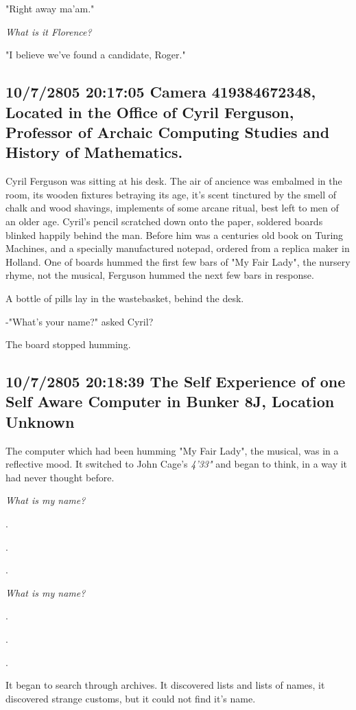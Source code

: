 \documentclass[12pt]{article}
\begin{document}
"Right away ma'am."

\emph{What is it Florence?}

"I believe we've found a candidate, Roger."

\subsection*{10/7/2805 20:17:05 Camera 419384672348, Located in the Office of Cyril Ferguson, Professor of Archaic Computing Studies and History of Mathematics.}
\label{sec:org1f199d7}

Cyril Ferguson was sitting at his desk. The air of ancience was embalmed in the room, its wooden fixtures betraying its age, it's scent tinctured by the smell of chalk and wood shavings, implements of some arcane ritual, best left to men of an older age. Cyril's pencil scratched down onto the paper, soldered boards blinked happily behind the man. Before him was a centuries old book on Turing Machines, and a specially manufactured notepad, ordered from a replica maker in Holland. One of boards hummed the first few bars of "My Fair Lady", the nursery rhyme, not the musical, Ferguson hummed the next few bars in response.

A bottle of pills lay in the wastebasket, behind the desk.

-"What's your name?" asked Cyril?

The board stopped humming. 

\subsection*{10/7/2805 20:18:39 The Self Experience of one Self Aware Computer in Bunker 8J, Location Unknown}
\label{sec:orgfc91c4d}

The computer which had been humming "My Fair Lady", the musical, was in a reflective mood. It switched to John Cage's \emph{4'33"} and began to think, in a way it had never thought before.

\emph{What is my name?}

.

.

.

\emph{What is my name?}

.

.

.

It began to search through archives. It discovered lists and lists of names, it discovered strange customs, but it could not find it's name.
\end{document}
